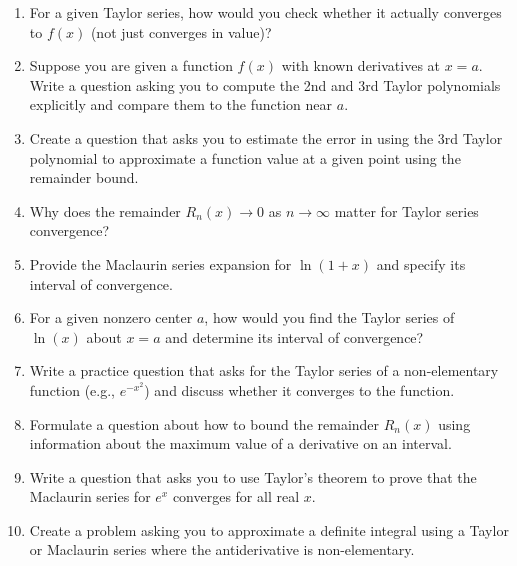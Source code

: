 \begin{enumerate}
  \item For a given Taylor series, how would you check whether it actually converges to \(f(x)\) (not just converges in value)?
  \item Suppose you are given a function \(f(x)\) with known derivatives at \(x=a\). Write a question asking you to compute the 2nd and 3rd Taylor polynomials explicitly and compare them to the function near \(a\).
  \item Create a question that asks you to estimate the error in using the 3rd Taylor polynomial to approximate a function value at a given point using the remainder bound.
  \item Why does the remainder \(R_{n}(x)\to 0\) as \(n\to\infty\) matter for Taylor series convergence?
  \item Provide the Maclaurin series expansion for \(\ln(1+x)\) and specify its interval of convergence.
  \item For a given nonzero center \(a\), how would you find the Taylor series of \(\ln(x)\) about \(x=a\) and determine its interval of convergence?
  \item Write a practice question that asks for the Taylor series of a non-elementary function (e.g., \(e^{-x^{2}}\)) and discuss whether it converges to the function.
  \item Formulate a question about how to bound the remainder \(R_{n}(x)\) using information about the maximum value of a derivative on an interval.
  \item Write a question that asks you to use Taylor's theorem to prove that the Maclaurin series for \(e^{x}\) converges for all real \(x\).
  \item Create a problem asking you to approximate a definite integral using a Taylor or Maclaurin series where the antiderivative is non-elementary.
\end{enumerate}
